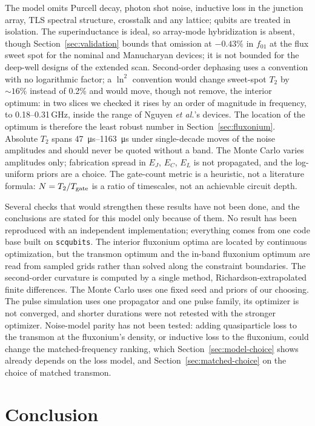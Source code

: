 \documentclass{SciPost}
\begin{document}
The model omits Purcell decay, photon shot noise, inductive loss in the junction array, TLS
spectral structure, crosstalk and any lattice; qubits are treated in isolation. The
superinductance is ideal, so array-mode hybridization is absent, though Section~\ref{sec:validation} bounds that omission at $-0.43\%$ in $f_{01}$ at the flux sweet
spot for the nominal and Manucharyan devices; it is not bounded for the deep-well designs of the
extended scan. Second-order dephasing uses a convention with no logarithmic factor; a $\ln^2$ convention would change sweet-spot $T_2$ by ${\sim}16\%$ instead of 0.2\% and would move,
though not remove, the interior optimum: in two slices we checked it rises by an order of magnitude in
frequency, to 0.18--0.31\,GHz, inside the range of Nguyen \emph{et al.}'s devices. The location of the
optimum is therefore the least robust number in Section~\ref{sec:fluxonium}. Absolute $T_2$ spans \SIrange{47}{1163}{\micro\second} under single-decade moves of the noise
amplitudes and should never be quoted without a band. The Monte Carlo varies amplitudes only; fabrication
spread in $E_J$, $E_C$, $E_L$ is not propagated, and the log-uniform priors are a choice. The
gate-count metric is a heuristic, not a literature formula: $N = T_2/T_{\rm gate}$ is a ratio of
timescales, not an achievable circuit depth.

Several checks that would strengthen these results have not been done, and the conclusions are
stated for this model only because of them. No result has been reproduced with an independent
implementation; everything comes from one code base built on \texttt{scqubits}. The interior
fluxonium optima are located by continuous optimization, but the transmon optimum and the in-band
fluxonium optimum are read from sampled grids rather than solved along the constraint boundaries.
The second-order curvature is computed by a single method, Richardson-extrapolated finite
differences. The Monte Carlo uses one fixed seed and priors of our choosing. The pulse simulation
uses one propagator and one pulse family, its optimizer is not converged, and shorter durations
were not retested with the stronger optimizer. Noise-model parity has not been tested: adding
quasiparticle loss to the transmon at the fluxonium's density, or inductive loss to the fluxonium,
could change the matched-frequency ranking, which Section~\ref{sec:model-choice} shows already
depends on the loss model, and Section~\ref{sec:matched-choice} on the choice of matched transmon.

\section{Conclusion}
\end{document}
